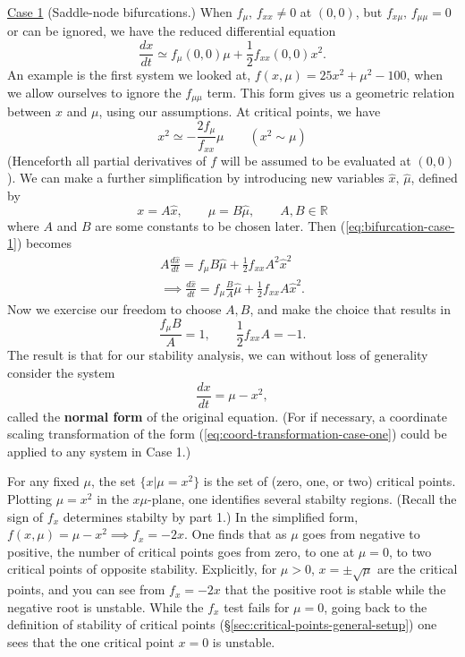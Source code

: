 \documentclass[11pt, letterpaper, oneside]{article}     %
\numberwithin{equation}{subsection}
\theoremstyle{definition}
\numberwithin{theorem}{section}
\theoremstyle{remark}
\newcommand{\RR}{\mathbb{R}}
\begin{document}
\begin{enumerate}
  \underline{Case 1} (Saddle-node bifurcations.) When $f_{\mu},\,f_{xx}\neq 0$ at $(0,0)$, but $f_{x\mu},\,f_{\mu\mu} = 0$ or can be ignored, we have the reduced differential equation
  \begin{equation}\label{eq:bifurcation-case-1}
    \frac{dx}{dt} \simeq f_\mu(0,0)\mu + \frac{1}{2}f_{xx}(0,0)x^2.
  \end{equation}
  An example is the first system we looked at, $f(x,\mu) = 25x^2 + \mu^2 - 100$, when we allow ourselves to ignore the $f_{\mu\mu}$ term. This form gives us a geometric relation between $x$ and $\mu$, using our assumptions. At critical points, we have
  \begin{equation}
    x^2 \simeq -\frac{2f_\mu}{f_{xx}}\mu \quad\quad (x^2\sim \mu)
  \end{equation}
  (Henceforth all partial derivatives of $f$ will be assumed to be evaluated at $(0,0)$). We can make a further simplification by introducing new variables $\hat x,\,\hat\mu$, defined by
  \begin{equation}\label{eq:coord-transformation-case-one}
    x = A\hat x,\quad\quad
    \mu = B\hat\mu,\quad\quad
    A,B\in\RR
  \end{equation}
  where $A$ and $B$ are some constants to be chosen later. Then (\ref{eq:bifurcation-case-1}) becomes
  \begin{align}
    A\frac{d\hat x}{dt} = f_\mu B\hat\mu + \frac{1}{2}f_{xx}A^2\hat x^2\\
    \implies \frac{d\hat x}{dt} = f_\mu \frac{B}{A}\hat\mu + \frac{1}{2}f_{xx}A\hat x^2.
  \end{align}
  Now we exercise our freedom to choose $A,B$, and make the choice that results in
  \begin{equation}
    \frac{f_\mu B}{A} = 1,\quad\quad \frac{1}{2}f_{xx}A = -1.
  \end{equation}
  The result is that for our stability analysis, we can without loss of generality consider the system
  \begin{equation}
    \frac{dx}{dt} = \mu - x^2,
  \end{equation}
  called the \textbf{normal form} of the original equation. (For if necessary, a coordinate scaling transformation of the form (\ref{eq:coord-transformation-case-one}) could be applied to any system in Case 1.)

  For any fixed $\mu$, the set $\{x|\mu = x^2\}$ is the set of (zero, one, or two) critical points. Plotting $\mu = x^2$ in the $x\mu$-plane, one identifies several stabilty regions. (Recall the sign of $f_x$ determines stabilty by part 1.) In the simplified form, $f(x,\mu) = \mu - x^2\implies f_x = -2x$. One finds that as $\mu$ goes from negative to positive, the number of critical points goes from zero, to one at $\mu = 0$, to two critical points of opposite stability. Explicitly, for $\mu > 0$, $x = \pm\sqrt{\mu}$ are the critical points, and you can see from $f_x = -2x$ that the positive root is stable while the negative root is unstable. While the $f_x$ test fails for $\mu = 0$, going back to the definition of stability of critical points (\S\ref{sec:critical-points-general-setup}) one sees that the one critical point $x = 0$ is unstable.


\end{enumerate}
\end{document}
